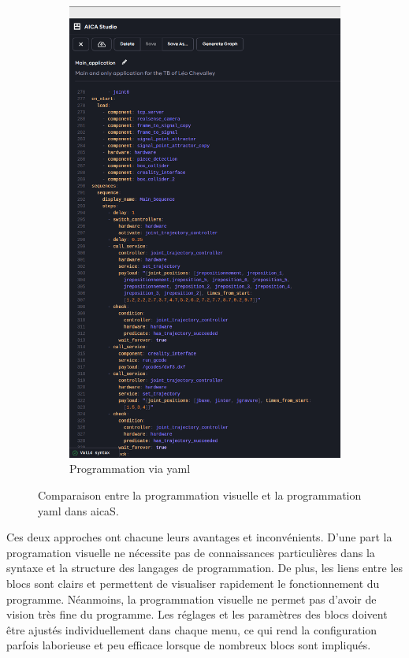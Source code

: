 \begin{figure}[H]
\begin{subfigure}{0.48\textwidth}
        \includegraphics[width=0.95\linewidth]{assets/figures/AICA_Yaml.png}
        \caption{Programmation via \gls{yaml}}
        \label{fig:prog_yaml}
    \end{subfigure}
    \caption{Comparaison entre la programmation visuelle et la programmation \gls{yaml} dans \gls{aicaS}.}
    \label{fig:comparaison_yaml_visuel}
\end{figure}

Ces deux approches ont chacune leurs avantages et inconvénients.
D'une part la programation visuelle ne nécessite pas de connaissances particulières dans la syntaxe et la structure des langages de programmation. De plus, les liens entre les blocs sont clairs et permettent de visualiser rapidement le fonctionnement du programme. Néanmoins, la programmation visuelle ne permet pas d'avoir de vision très fine du programme. Les réglages et les paramètres des blocs doivent être ajustés individuellement dans chaque menu, ce qui rend la configuration parfois laborieuse et peu efficace lorsque de nombreux blocs sont impliqués.

